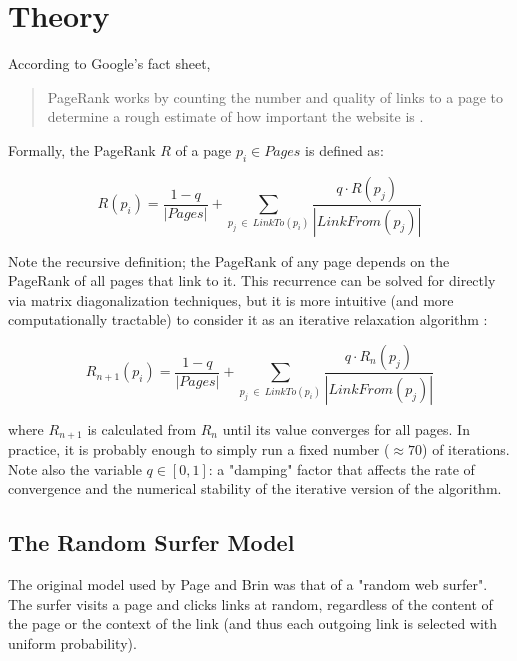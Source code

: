\section{Theory} \label{sec:theory}
\newcommand{\vect}[1]{\boldsymbol{#1}}
\newcommand{\expc}[1]{\left< #1 \right>}

According to Google's fact sheet,
\begin{quote} 
PageRank works by counting the number and quality of links to a page to 
determine a rough estimate of how important the website is \cite{googlequote}. 
\end{quote}

Formally, the PageRank $R$ of a page $p_i \in Pages$ is defined as:

\begin{equation}\label{eqPRmain}
    R(p_i) = \frac{1 - q}{|Pages|} + \sum_{p_j \: \in \: LinkTo(p_i)} \frac{ q \cdot R(p_j) }{ |LinkFrom(p_j)| }
\end{equation}
    
Note the recursive definition; the PageRank of any page depends on the PageRank
of all pages that link to it.  This recurrence can be solved for directly via 
matrix diagonalization techniques, but it is more intuitive (and more 
computationally tractable) to consider it as an iterative relaxation algorithm \cite{efactory}:

\begin{equation}\label{eqPRiter}
    R_{n+1}(p_i) = \frac{1 - q}{|Pages|} + \sum_{p_j \: \in \: LinkTo(p_i)} \frac{ q \cdot R_n(p_j) }{ |LinkFrom(p_j)| }
\end{equation}

where $R_{n+1}$ is calculated from $R_n$ until its value converges for all pages.
In practice, it is probably enough to simply run a fixed number ($\approx 70$) of iterations.
Note also the variable $q \in [0,1]$: a "damping" factor that affects the rate of 
convergence and the numerical stability of the iterative version of the algorithm.

\subsection{The Random Surfer Model} \label{sec:armodel}
The original model used by Page and Brin was that of a "random web surfer".
The surfer visits a page and clicks links at random, regardless of the content
of the page or the context of the link (and thus each outgoing link is selected
with uniform probability).  

